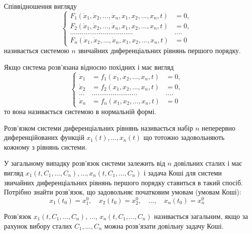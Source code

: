 Співвідношення вигляду
\begin{equation*}
	\left\{
		\begin{aligned}
			F_1(\dot x_1, \dot x_2, \ldots, \dot x_n, x_1, x_2, \ldots, x_n, t) &= 0, \\
			F_2(\dot x_1, \dot x_2, \ldots, \dot x_n, x_1, x_2, \ldots, x_n, t) &= 0, \\
			\ldots \ldots \ldots \ldots \ldots \ldots \ldots \ldots \ldots \ldots \ldots & \ldots . \\
			F_n(\dot x_1, \dot x_2, \ldots, \dot x_n, x_1, x_2, \ldots, x_n, t) &= 0
		\end{aligned}
	\right.
\end{equation*}
називається системою $n$ звичайних диференціальних рівнянь першого порядку. \parvskip

Якщо система розв'язана відносно похідних і має вигляд
\begin{equation*}
	\left\{
		\begin{aligned}
			\dot x_1 &= f_1(x_1, x_2, \ldots, x_n, t) &= 0, \\
			\dot x_2 &= f_2(x_1, x_2, \ldots, x_n, t) &= 0, \\
			\ldots & \ldots \ldots \ldots \ldots \ldots \ldots \ldots \ldots &\ldots . \\
			\dot x_n &= f_n(x_1, x_2, \ldots, x_n, t) &= 0
		\end{aligned}
	\right.
\end{equation*}
то вона називається системою в нормальній формі.

\begin{definition}
	Розв'язком системи диференціальних рівнянь на\-зи\-ва\-є\-ть\-ся набір $n$ неперервно диференційованих функцій $x_1(t), \ldots, x_n(t)$ що тотожно задовольняють кожному з рівнянь системи.
\end{definition}

У загальному випадку розв'язок системи залежить від $n$ довільних сталих і має вигляд  $x_1(t, C_1, \ldots, C_n), \ldots, x_n(t, C_1, \ldots, C_n)$ і задача Коші для системи звичайних диференціальних рівнянь першого порядку ставиться в такий спосіб. Потрібно знайти розв'язок, що задовольняє початковим умовам (умовам Коші):
\begin{equation*}
	x_1(t_0) = x_1^0, \quad x_2(t_0) = x_2^0, \quad \ldots, \quad x_n(t_0) = x_n^0
\end{equation*}

\begin{definition}
	Розв'язок $x_1(t, C_1, \ldots, C_n)$, $\ldots$, $x_n(t, C_1, \ldots, C_n)$ на\-зи\-ва\-є\-ть\-ся загальним, якщо за рахунок вибору сталих $C_1, \ldots, C_n$ можна роз\-в'яз\-а\-ти довільну задачу Коші.
\end{definition}

